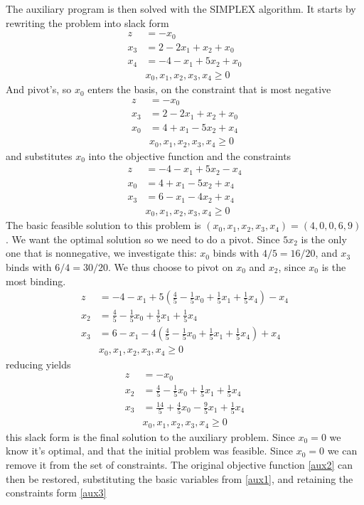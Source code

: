 \documentclass[10pt]{article}
\begin{document}
The auxiliary program is then solved with the SIMPLEX algorithm. It starts by rewriting the problem into slack form
\begin{align}
    z &= -x_0 \\ 
  x_3 &= 2 - 2x_1 + x_2 + x_0  \nonumber\\
  x_4 &= -4 - x_1  + 5x_2 + x_0  \nonumber\\
  &x_0, x_1, x_2, x_3, x_4    \geq 0 \nonumber 
\end{align}
And pivot's, so $x_0$ enters the basis, on the constraint that is most negative
\begin{align}
    z &= -x_0 \\ 
  x_3 &= 2 - 2x_1 + x_2 + x_0  \nonumber\\
  x_0 &= 4 + x_1 -5x_2 + x_4    \nonumber\\
  &x_0, x_1, x_2, x_3, x_4    \geq 0 \nonumber 
\end{align}
and substitutes $x_0$ into the objective function and the constraints
\begin{align}
    z &= -4 - x_1 + 5x_2 - x_4\\ 
  x_0 &= 4 + x_1 - 5x_2 + x_4   \nonumber\\
  x_3 &= 6 - x_1 - 4x_2 + x_4   \nonumber\\
  &x_0, x_1, x_2, x_3, x_4    \geq 0 \nonumber 
\end{align}
The basic feasible solution to this problem is $(x_0, x_1, x_2, x_3, x_4) = (4, 0, 0, 6, 9)$. We want the optimal solution so we need to do a pivot. Since $5x_2$ is the only one that is nonnegative, we investigate this: $x_0$ binds with $4/5=16/20$, and $x_3$ binds with $6/4=30/20$. We thus choose to pivot on $x_0$ and $x_2$, since $x_0$ is the most binding.
\begin{align}
    z &= -4 - x_1 + 5(\frac{4}{5} - \frac{1}{5} x_0 + \frac{1}{5} x_1 + \frac{1}{5} x_4) - x_4\\ 
  x_2 &= \frac{4}{5} - \frac{1}{5} x_0 + \frac{1}{5} x_1 + \frac{1}{5} x_4    \nonumber\\
  x_3 &= 6 - x_1 - 4(\frac{4}{5} - \frac{1}{5} x_0 + \frac{1}{5} x_1 + \frac{1}{5} x_4) + x_4   \nonumber\\
  &x_0, x_1, x_2, x_3, x_4    \geq 0 \nonumber 
\end{align}
reducing yields
\begin{align}
    z &= - x_0 \label{aux3}\\ 
  x_2 &= \frac{4}{5} - \frac{1}{5} x_0 + \frac{1}{5} x_1 + \frac{1}{5} x_4    \nonumber\\
  x_3 &= \frac{14}{5} + \frac{4}{5} x_0 - \frac{9}{5} x_1 + \frac{1}{5} x_4    \nonumber\\
  &x_0, x_1, x_2, x_3, x_4    \geq 0 \nonumber 
\end{align}
this slack form is the final solution to the auxiliary problem. Since $x_0 = 0$ we know it's optimal, and that the initial problem was feasible. Since $x_0=0$ we can remove it from the set of constraints. The original objective function \ref{aux2} can then be restored, substituting the basic variables from \ref{aux1}, and retaining the constraints form \ref{aux3}
\end{document}
